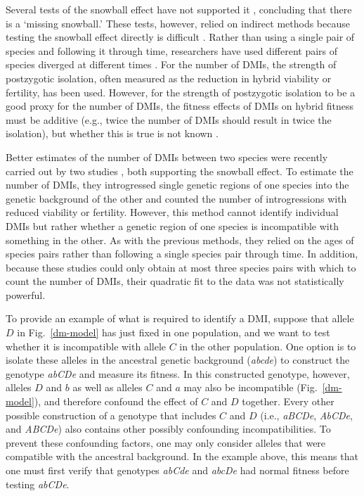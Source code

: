 \begin{doublespace}
Several tests of the snowball effect have not supported it
\citep{lij03,men04,gou10}, concluding that there is a `missing snowball.'
%
These tests, however, relied on indirect methods
because testing the snowball effect directly is difficult \citep{men04}.
%
Rather than using a single pair of species and following it through time,
researchers have used different pairs of species diverged at different times
\citep{mal08,sco08}.
%
For the number of DMIs, the strength of postzygotic isolation,
often measured as the reduction in hybrid viability or fertility, has been used.
%
However, for the strength of postzygotic isolation to be a good proxy
for the number of DMIs,
the fitness effects of DMIs on hybrid fitness must be additive
\citep{men04,bol05}
(e.g., twice the number of DMIs should result in twice the isolation),
but whether this is true is not known \citep{bol05,pre10}.




Better estimates of the number of DMIs between two species
were recently carried out by two studies \citep{mat10,moy10},
both supporting the snowball effect.
%
To estimate the number of DMIs, they introgressed single genetic regions
of one species into the genetic background of the other and
counted the number of introgressions with reduced viability or fertility.
%
However, this method cannot identify individual DMIs
but rather whether a genetic region of one species
is incompatible with something in the other.
%
As with the previous methods, they relied on the ages of species pairs
rather than following a single species pair through time.
%
In addition, because these studies could only obtain
at most three species pairs with which to count the number of DMIs,
their quadratic fit to the data was not statistically powerful.




To provide an example of what is required to identify a DMI,
suppose that allele $D$ in Fig.~\ref{dm-model} has just fixed
in one population, and we want to test whether it is incompatible
with allele $C$ in the other population.
%
One option is to isolate these alleles in the ancestral genetic background
(\emph{abcde}) to construct the genotype \emph{abCDe} and measure its fitness.
%
In this constructed genotype, however,
alleles $D$ and $b$ as well as alleles $C$ and $a$
may also be incompatible (Fig.~\ref{dm-model}),
and therefore confound the effect of $C$ and $D$ together.
%
Every other possible construction of a genotype that includes $C$ and $D$
(i.e., \emph{aBCDe}, \emph{AbCDe}, and \emph{ABCDe})
also contains other possibly confounding incompatibilities.
%
To prevent these confounding factors, one may only consider
alleles that were compatible with the ancestral background.
%
In the example above, this means that one must first verify that genotypes
\emph{abCde} and \emph{abcDe} had normal fitness before testing \emph{abCDe}.



\end{doublespace}
